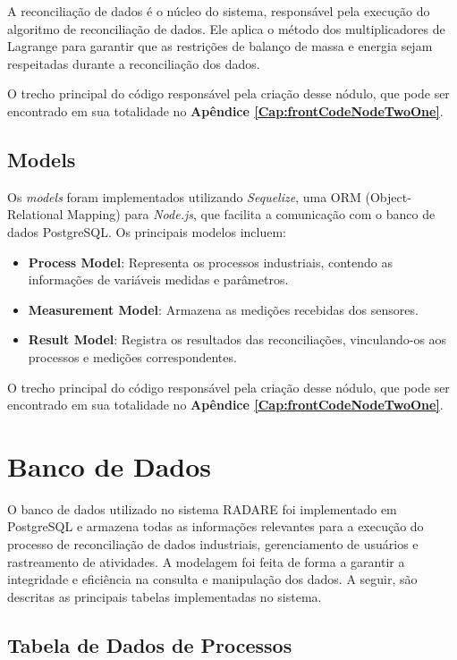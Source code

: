 A reconciliação de dados é o núcleo do sistema, responsável pela execução do algoritmo de reconciliação de dados. Ele aplica o método dos multiplicadores de Lagrange para garantir que as restrições de balanço de massa e energia sejam respeitadas durante a reconciliação dos dados.

O trecho principal do código responsável pela criação desse nódulo, que pode ser encontrado em sua totalidade no \textbf{Apêndice \ref{Cap:frontCodeNodeTwoOne}}.

\subsection{Models}

Os \textit{models} foram implementados utilizando \textit{Sequelize}, uma ORM (Object-Relational Mapping) para \textit{Node.js}, que facilita a comunicação com o banco de dados PostgreSQL. Os principais modelos incluem:

\begin{itemize} \item \textbf{Process Model}: Representa os processos industriais, contendo as informações de variáveis medidas e parâmetros. \item \textbf{Measurement Model}: Armazena as medições recebidas dos sensores. \item \textbf{Result Model}: Registra os resultados das reconciliações, vinculando-os aos processos e medições correspondentes. \end{itemize}

O trecho principal do código responsável pela criação desse nódulo, que pode ser encontrado em sua totalidade no \textbf{Apêndice \ref{Cap:frontCodeNodeTwoOne}}.

\section{Banco de Dados}

O banco de dados utilizado no sistema RADARE foi implementado em PostgreSQL e armazena todas as informações relevantes para a execução do processo de reconciliação de dados industriais, gerenciamento de usuários e rastreamento de atividades. A modelagem foi feita de forma a garantir a integridade e eficiência na consulta e manipulação dos dados. A seguir, são descritas as principais tabelas implementadas no sistema.

\subsection{Tabela de Dados de Processos}


